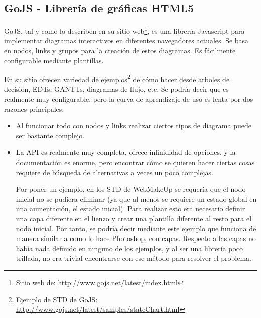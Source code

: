 \subsection{GoJS - Librería de gráficas HTML5}
\label{sec:Interacciones-GoJS}

GoJS, tal y como lo describen en su sitio web\footnote{Sitio web de: \url{ http://www.gojs.net/latest/index.html}}, es una librería Javascript para implementar diagramas interactivos en diferentes navegadores actuales. Se basa en nodos, links y grupos para la creación de estos diagramas. Es fácilmente configurable mediante plantillas.

En su sitio ofrecen variedad de ejemplos\footnote{Ejemplo de STD de GoJS: \url{http://www.gojs.net/latest/samples/stateChart.html}} de cómo hacer desde arboles de decisión, EDTs, GANTTs, diagramas de flujo, etc. Se podría decir que es realmente muy configurable, pero la curva de aprendizaje de uso es lenta por dos razones principales:
\begin{itemize}
\item{Al funcionar todo con nodos y links realizar ciertos tipos de diagrama puede ser bastante complejo.}
\item{La API es realmente muy completa, ofrece infinididad de opciones, y la documentación es enorme, pero encontrar cómo se quieren hacer ciertas cosas requiere de búsqueda de alternativas a veces un poco complejas.

Por poner un ejemplo, en los STD de WebMakeUp se requería que el nodo inicial no se pudiera eliminar (ya que al menos se requiere un estado global en una aumentación, el estado inicial). Para realizar esto era necesario definir una capa diferente en el lienzo y crear una plantilla diferente al resto para el nodo inicial. Por tanto, se podría decir mediante este ejemplo que funciona de manera similar a como lo hace Photoshop, con capas. Respecto a las capas no había nada definido en ninguno de los ejemplos, y al ser una librería poco trillada, no era trivial encontrarse con ese método para resolver el problema.}
\end{itemize}

